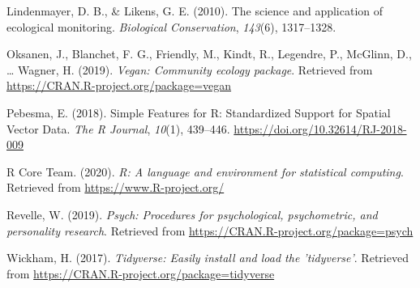 \documentclass[11pt,]{article}
\begin{document}
\hypertarget{ref-lindenmayer2010science}{}
Lindenmayer, D. B., \& Likens, G. E. (2010). The science and application
of ecological monitoring. \emph{Biological Conservation}, \emph{143}(6),
1317--1328.

\hypertarget{ref-VeganPack}{}
Oksanen, J., Blanchet, F. G., Friendly, M., Kindt, R., Legendre, P.,
McGlinn, D., \ldots{} Wagner, H. (2019). \emph{Vegan: Community ecology
package}. Retrieved from \url{https://CRAN.R-project.org/package=vegan}

\hypertarget{ref-sfpackage}{}
Pebesma, E. (2018). Simple Features for R: Standardized Support for
Spatial Vector Data. \emph{The R Journal}, \emph{10}(1), 439--446.
\url{https://doi.org/10.32614/RJ-2018-009}

\hypertarget{ref-RSoft}{}
R Core Team. (2020). \emph{R: A language and environment for statistical
computing}. Retrieved from \url{https://www.R-project.org/}

\hypertarget{ref-psych}{}
Revelle, W. (2019). \emph{Psych: Procedures for psychological,
psychometric, and personality research}. Retrieved from
\url{https://CRAN.R-project.org/package=psych}

\hypertarget{ref-Tidyverse}{}
Wickham, H. (2017). \emph{Tidyverse: Easily install and load the
'tidyverse'}. Retrieved from
\url{https://CRAN.R-project.org/package=tidyverse}




\newpage
\singlespacing 
\end{document}
